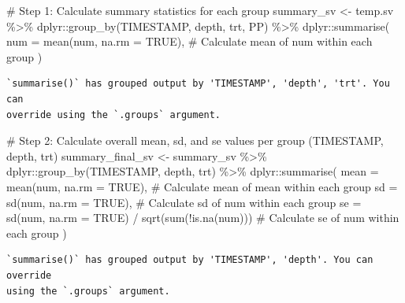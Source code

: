 \documentclass[
  letterpaper,
  DIV=11,
  numbers=noendperiod]{scrartcl}
\newenvironment{Shaded}{\begin{snugshade}}{\end{snugshade}}
\newcommand{\AttributeTok}[1]{\textcolor[rgb]{0.40,0.45,0.13}{#1}}
\newcommand{\CommentTok}[1]{\textcolor[rgb]{0.37,0.37,0.37}{#1}}
\newcommand{\ConstantTok}[1]{\textcolor[rgb]{0.56,0.35,0.01}{#1}}
\newcommand{\FunctionTok}[1]{\textcolor[rgb]{0.28,0.35,0.67}{#1}}
\newcommand{\NormalTok}[1]{\textcolor[rgb]{0.00,0.23,0.31}{#1}}
\newcommand{\OtherTok}[1]{\textcolor[rgb]{0.00,0.23,0.31}{#1}}
\newcommand{\SpecialCharTok}[1]{\textcolor[rgb]{0.37,0.37,0.37}{#1}}
\begin{document}
\begin{Shaded}
\begin{Highlighting}[]
\CommentTok{\# Step 1: Calculate summary statistics for each group}
\NormalTok{summary\_sv }\OtherTok{\textless{}{-}}\NormalTok{ temp.sv }\SpecialCharTok{\%\textgreater{}\%}
\NormalTok{  dplyr}\SpecialCharTok{::}\FunctionTok{group\_by}\NormalTok{(TIMESTAMP, depth, trt, PP) }\SpecialCharTok{\%\textgreater{}\%}
\NormalTok{  dplyr}\SpecialCharTok{::}\FunctionTok{summarise}\NormalTok{(}
    \AttributeTok{num =} \FunctionTok{mean}\NormalTok{(num, }\AttributeTok{na.rm =} \ConstantTok{TRUE}\NormalTok{),  }\CommentTok{\# Calculate mean of \textquotesingle{}num\textquotesingle{} within each group}
\NormalTok{  )}
\end{Highlighting}
\end{Shaded}

\begin{verbatim}
`summarise()` has grouped output by 'TIMESTAMP', 'depth', 'trt'. You can
override using the `.groups` argument.
\end{verbatim}

\begin{Shaded}
\begin{Highlighting}[]
\CommentTok{\# Step 2: Calculate overall mean, sd, and se values per group (TIMESTAMP, depth, trt)}
\NormalTok{summary\_final\_sv }\OtherTok{\textless{}{-}}\NormalTok{ summary\_sv }\SpecialCharTok{\%\textgreater{}\%}
\NormalTok{  dplyr}\SpecialCharTok{::}\FunctionTok{group\_by}\NormalTok{(TIMESTAMP, depth, trt) }\SpecialCharTok{\%\textgreater{}\%}
\NormalTok{  dplyr}\SpecialCharTok{::}\FunctionTok{summarise}\NormalTok{(}
    \AttributeTok{mean =} \FunctionTok{mean}\NormalTok{(num, }\AttributeTok{na.rm =} \ConstantTok{TRUE}\NormalTok{),  }\CommentTok{\# Calculate mean of \textquotesingle{}mean\textquotesingle{} within each group}
    \AttributeTok{sd =} \FunctionTok{sd}\NormalTok{(num, }\AttributeTok{na.rm =} \ConstantTok{TRUE}\NormalTok{),      }\CommentTok{\# Calculate sd of \textquotesingle{}num\textquotesingle{} within each group}
    \AttributeTok{se =} \FunctionTok{sd}\NormalTok{(num, }\AttributeTok{na.rm =} \ConstantTok{TRUE}\NormalTok{) }\SpecialCharTok{/} \FunctionTok{sqrt}\NormalTok{(}\FunctionTok{sum}\NormalTok{(}\SpecialCharTok{!}\FunctionTok{is.na}\NormalTok{(num)))  }\CommentTok{\# Calculate se of \textquotesingle{}num\textquotesingle{} within each group}
\NormalTok{  )}
\end{Highlighting}
\end{Shaded}

\begin{verbatim}
`summarise()` has grouped output by 'TIMESTAMP', 'depth'. You can override
using the `.groups` argument.
\end{verbatim}
\end{document}

